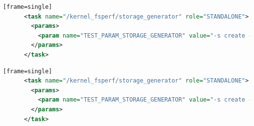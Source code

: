 \documentclass[
  color, %
  table, %
  lof,   %
  lot,   %
]{fithesis3}
\begin{document}
\begin{lstlisting}[language=xml, caption={Executing task and passing arguments}][frame=single]
      <task name="/kernel_fsperf/storage_generator" role="STANDALONE">
        <params>
          <param name="TEST_PARAM_STORAGE_GENERATOR" value="-s create -f ext4 -t single -m /RHTSspareLUN1 -d /dev/sdc -T 1SASHDD_ext4"/>
        </params>
      </task>
\end{lstlisting}

\begin{lstlisting}[language=xml, caption={Configuring storage using storage generator in beaker environment}][frame=single]
      <task name="/kernel_fsperf/storage_generator" role="STANDALONE">
        <params>
          <param name="TEST_PARAM_STORAGE_GENERATOR" value="-s create -f xfs -t lvm -m /RHTSspareLUN1 -r jokerlvm -T 2SATASSDLVM_xfs"/>
        </params>
      </task>
\end{lstlisting}
\end{document}
